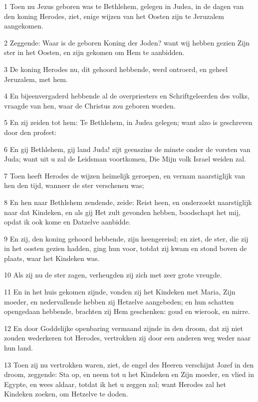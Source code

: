 \par 1 Toen nu Jezus geboren was te Bethlehem, gelegen in Judea, in de dagen van den koning Herodes, ziet, enige wijzen van het Oosten zijn te Jeruzalem aangekomen.
\par 2 Zeggende: Waar is de geboren Koning der Joden? want wij hebben gezien Zijn ster in het Oosten, en zijn gekomen om Hem te aanbidden.
\par 3 De koning Herodes nu, dit gehoord hebbende, werd ontroerd, en geheel Jeruzalem, met hem.
\par 4 En bijeenvergaderd hebbende al de overpriesters en Schriftgeleerden des volks, vraagde van hen, waar de Christus zou geboren worden.
\par 5 En zij zeiden tot hem: Te Bethlehem, in Judea gelegen; want alzo is geschreven door den profeet:
\par 6 En gij Bethlehem, gij land Juda! zijt geenszins de minste onder de vorsten van Juda; want uit u zal de Leidsman voortkomen, Die Mijn volk Israel weiden zal.
\par 7 Toen heeft Herodes de wijzen heimelijk geroepen, en vernam naarstiglijk van hen den tijd, wanneer de ster verschenen was;
\par 8 En hen naar Bethlehem zendende, zeide: Reist heen, en onderzoekt naarstiglijk naar dat Kindeken, en als gij Het zult gevonden hebben, boodschapt het mij, opdat ik ook kome en Datzelve aanbidde.
\par 9 En zij, den koning gehoord hebbende, zijn heengereisd; en ziet, de ster, die zij in het oosten gezien hadden, ging hun voor, totdat zij kwam en stond boven de plaats, waar het Kindeken was.
\par 10 Als zij nu de ster zagen, verheugden zij zich met zeer grote vreugde.
\par 11 En in het huis gekomen zijnde, vonden zij het Kindeken met Maria, Zijn moeder, en nedervallende hebben zij Hetzelve aangebeden; en hun schatten opengedaan hebbende, brachten zij Hem geschenken: goud en wierook, en mirre.
\par 12 En door Goddelijke openbaring vermaand zijnde in den droom, dat zij niet zouden wederkeren tot Herodes, vertrokken zij door een anderen weg weder naar hun land.
\par 13 Toen zij nu vertrokken waren, ziet, de engel des Heeren verschijnt Jozef in den droom, zeggende: Sta op, en neem tot u het Kindeken en Zijn moeder, en vlied in Egypte, en wees aldaar, totdat ik het u zeggen zal; want Herodes zal het Kindeken zoeken, om Hetzelve te doden.
